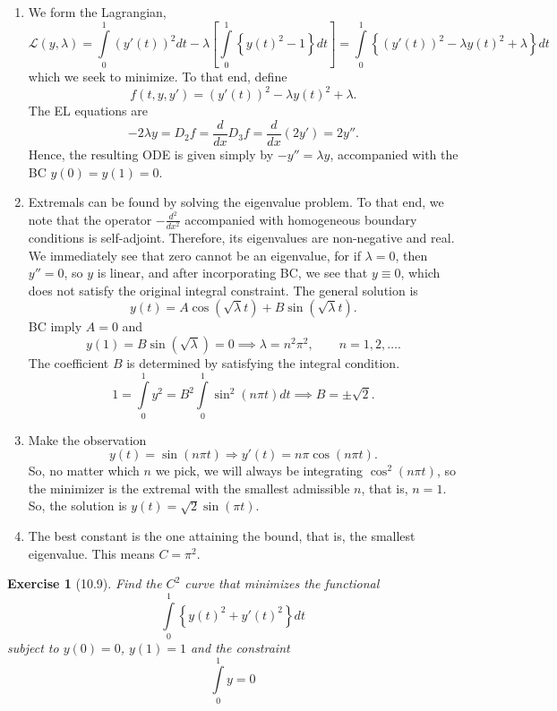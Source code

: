 \documentclass[letterpaper,twoside,11pt]{article}
\theoremstyle{mystyle}
\newtheorem*{exercise}{Exercise}
\newcommand{\cbk}{\color{black}}
\begin{document}
\begin{enumerate}
  \item We form the Lagrangian, 
  \[\mathcal{L}\left( {y,\lambda } \right) = \int\limits_0^1 {{{\left( {y'\left( t \right)} \right)}^2}dt}  - \lambda \left[ {\int\limits_0^1 {\left\{ {y{{\left( t \right)}^2} - 1} \right\}dt} } \right] = \int\limits_0^1 {\left\{ {{{\left( {y'\left( t \right)} \right)}^2} - \lambda y{{\left( t \right)}^2} + \lambda } \right\}dt} \]
  which we seek to minimize. To that end, define 
  \[f(t, y, y') = {{{\left( {y'\left( t \right)} \right)}^2} - \lambda y{{\left( t \right)}^2} + \lambda }.\]
  The EL equations are
  \[ - 2\lambda y = {D_2}f = \frac{d}{{dx}}{D_3}f = \frac{d}{{dx}}\left( {2y'} \right) = 2y''.\]
  Hence, the resulting ODE is given simply by $-y'' = \lambda y$, accompanied with the BC $y(0) = y(1) = 0$. 
  \item Extremals can be found by solving the eigenvalue problem. To that end, we note that the operator $-\frac{d^2}{dx^2}$ accompanied with homogeneous boundary conditions is self-adjoint. Therefore, its eigenvalues are non-negative and real. We immediately see that zero cannot be an eigenvalue, for if $\lambda = 0$, then $y'' = 0$, so $y$ is linear, and after incorporating BC, we see that $y \equiv 0$, which does not satisfy the original integral constraint. The general solution is  
  \[y\left( t \right) = A\cos \left( {\sqrt \lambda  t} \right) + B\sin \left( {\sqrt \lambda  t} \right).\]
  BC imply $A = 0$ and 
  \[y\left( 1 \right) = B\sin \left( {\sqrt \lambda  } \right) = 0 \implies \lambda  = {n^2}{\pi ^2},\qquad n =1, 2, \dots .\]
  The coefficient $B$ is determined by satisfying the integral condition.
  \[1 = \int\limits_0^1 {{y^2}}  = {B^2}\int\limits_0^1 {{{\sin }^2}\left( {n\pi t} \right)dt}  \implies  B =  \pm \sqrt 2 .\]
  \item Make the observation 
  \[y\left( t \right) = \sin \left( {n\pi t} \right) \Rightarrow y'\left( t \right) = n\pi \cos \left( {n\pi t} \right).\]
  So, no matter which $n$ we pick, we will always be integrating $\cos^2(n\pi t)$, so the minimizer is the extremal with the smallest admissible $n$, that is, $n = 1$. So, the solution is $y(t) = \sqrt{2} \sin(\pi t)$. 
  \item The best constant is the one attaining the bound, that is, the smallest eigenvalue. This means $C = \pi^{2}$. 
\end{enumerate}



\cbk 





\begin{exercise}[10.9]
  Find the $C^2$ curve that minimizes the functional 
  \[\int\limits_0^1 \left\{ y(t)^2 + y'(t)^2 \right\}dt \]
  subject to $y(0) = 0$, $y(1) = 1$ and the constraint 
  \[\int\limits_0^1 y = 0\]
\end{exercise}
\end{document}
